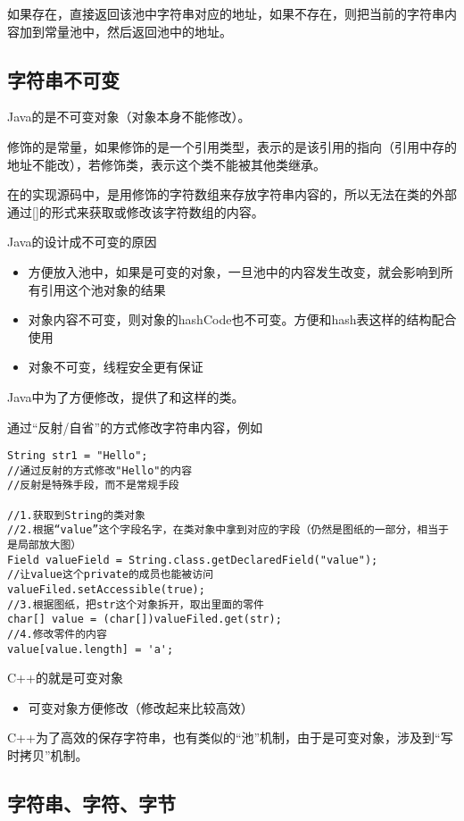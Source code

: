 \documentclass[a4paper]{report}
\begin{document}
如果存在，直接返回该池中字符串对应的地址，如果不存在，则把当前的字符串内容加到常量池中，然后返回池中的地址。
\subsection{字符串不可变}
Java的是不可变对象（对象本身不能修改）。

修饰的是常量，如果修饰的是一个引用类型，表示的是该引用的指向（引用中存的地址不能改），若修饰类，表示这个类不能被其他类继承。

在的实现源码中，是用修饰的字符数组来存放字符串内容的，所以无法在类的外部通过[]的形式来获取或修改该字符数组的内容。

Java的设计成不可变的原因
\begin{itemize}
\itemsep=0pt \parskip =0pt
  \item 方便放入池中，如果是可变的对象，一旦池中的内容发生改变，就会影响到所有引用这个池对象的结果
  \item 对象内容不可变，则对象的hashCode也不可变。方便和hash表这样的结构配合使用
  \item 对象不可变，线程安全更有保证
\end{itemize}
Java中为了方便修改，提供了和这样的类。

通过“反射/自省”的方式修改字符串内容，例如
\begin{lstlisting}[title=修改字符串]
String str1 = "Hello";
//通过反射的方式修改"Hello"的内容
//反射是特殊手段，而不是常规手段

//1.获取到String的类对象
//2.根据“value”这个字段名字，在类对象中拿到对应的字段（仍然是图纸的一部分，相当于是局部放大图）
Field valueField = String.class.getDeclaredField("value");
//让value这个private的成员也能被访问
valueFiled.setAccessible(true);
//3.根据图纸，把str这个对象拆开，取出里面的零件
char[] value = (char[])valueFiled.get(str);
//4.修改零件的内容
value[value.length] = 'a';
\end{lstlisting}

C++的就是可变对象
\begin{itemize}
\itemsep=0pt \parskip =0pt
  \item 可变对象方便修改（修改起来比较高效）
\end{itemize}
C++为了高效的保存字符串，也有类似的“池”机制，由于是可变对象，涉及到“写时拷贝”机制。

\subsection{字符串、字符、字节}
\end{document}

